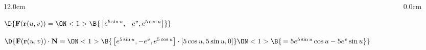 \begin{frame}
\begin{columns}
\begin{column}{12.0cm}
\vspace{0.4cm}

$\D{{\bf F}({\bf r}(u,v)) = 
\ON<1>{\B{\,\left[e^{5\sin u}, -e^{v}, e^{5\cos u}\right]}}}$

\vspace{0.3cm}

$\D{{\bf F}({\bf r}(u,v)) \cdot {\bf N} = 
\ON<1>{\B{\,\left[e^{5\sin u}, -e^{v}, e^{5\cos u}\right] \cdot [5\cos u,5\sin u,0]}}
\ON<1>{\B{\, = 5e^{5\sin u}\cos u - 5e^v\sin u}}}$

\vspace{2.8cm}

	
\end{column}\begin{column}{0.0cm}\end{column}\end{columns}
\end{frame}

